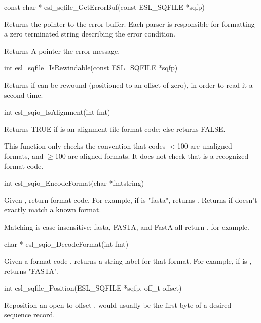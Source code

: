 \begin{sreapi}
\hypertarget{func:esl_sqfile_GetErrorBuf()}
{\item[const char * esl\_sqfile\_GetErrorBuf(const ESL\_SQFILE *sqfp)]}

Returns the pointer to the error buffer.
Each parser is responsible for formatting
a zero terminated string describing the
error condition.

Returns A pointer the error message.


\hypertarget{func:esl_sqfile_IsRewindable()}
{\item[int esl\_sqfile\_IsRewindable(const ESL\_SQFILE *sqfp)]}

Returns  if  can be rewound (positioned 
to an offset of zero), in order to read it a second
time.


\hypertarget{func:esl_sqio_IsAlignment()}
{\item[int esl\_sqio\_IsAlignment(int fmt)]}

Returns TRUE if  is an alignment file
format code; else returns FALSE.

This function only checks the convention
that  codes $<$100 are unaligned formats,
and $\geq$100 are aligned formats. It does
not check that  is a recognized format
code.


\hypertarget{func:esl_sqio_EncodeFormat()}
{\item[int esl\_sqio\_EncodeFormat(char *fmtstring)]}

Given , return format code.  For example, if
 is "fasta", returns . Returns 
 if  doesn't exactly match a 
known format.

Matching is case insensitive; fasta, FASTA, and FastA
all return , for example.


\hypertarget{func:esl_sqio_DecodeFormat()}
{\item[char * esl\_sqio\_DecodeFormat(int fmt)]}

Given a format code , returns a string label for
that format. For example, if  is ,
returns "FASTA". 


\hypertarget{func:esl_sqfile_Position()}
{\item[int esl\_sqfile\_Position(ESL\_SQFILE *sqfp, off\_t offset)]}

Reposition an open  to offset .
 would usually be the first byte of a
desired sequence record.


\end{sreapi}
